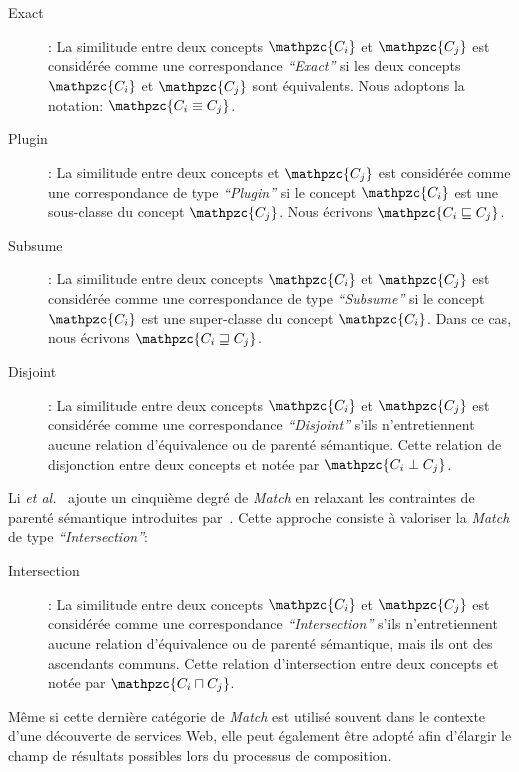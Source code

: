 \begin{description}
\item[Exact]: La similitude entre deux concepts $\mathpzc{C_i}$ et
  $\mathpzc{C_j}$ est considérée comme une correspondance
  \emph{``Exact''} si les deux concepts $\mathpzc{C_i}$ et
  $\mathpzc{C_j}$ sont équivalents. Nous adoptons la notation: {\large
    $\mathpzc{C_i \equiv C_j}$}.\medskip

\item[Plugin]: La similitude entre deux concepts et $\mathpzc{C_j}$
  est considérée comme une correspondance de type \emph{``Plugin''} si
  le concept $\mathpzc{C_i}$ est une sous-classe du concept
  $\mathpzc{C_j}$. Nous écrivons {\large
    $\mathpzc{C_i \sqsubseteq C_j}$}.\medskip

\item[Subsume]: La similitude entre deux concepts $\mathpzc{C_i}$ et
  $\mathpzc{C_j}$ est considérée comme une correspondance de type
  \emph{``Subsume''} si le concept $\mathpzc{C_i}$ est une
  super-classe du concept $\mathpzc{C_i}$. Dans ce cas, nous écrivons
  {\large $\mathpzc{C_i \sqsupseteq C_j}$}.\medskip

\item[Disjoint]: La similitude entre deux concepts $\mathpzc{C_i}$ et
  $\mathpzc{C_j}$ est considérée comme une correspondance
  \emph{``Disjoint''} s'ils n'entretiennent aucune relation
  d'équivalence ou de parenté sémantique. Cette relation de
  disjonction entre deux concepts et notée par {\large
    $\mathpzc{C_i \perp C_j}$}.\medskip
\end{description}


Li \emph{et al.}~\cite{li2004software} ajoute un cinquième degré de
\emph{Match} en relaxant les contraintes de parenté sémantique
introduites par~\cite{paolucci2002semantic}. Cette approche consiste à
valoriser la \emph{Match} de type \emph{``Intersection''}:

\begin{description}
\item[Intersection]: La similitude entre deux concepts $\mathpzc{C_i}$
  et $\mathpzc{C_j}$ est considérée comme une correspondance
  \emph{``Intersection''} s'ils n'entretiennent aucune relation
  d'équivalence ou de parenté sémantique, mais ils ont des ascendants
  communs. Cette relation d'intersection entre deux concepts et notée
  par {\large $\mathpzc{C_i \sqcap C_j}$}.\medskip
\end{description}

Même si cette dernière catégorie de \emph{Match} est utilisé souvent
dans le contexte d'une découverte de services Web, elle peut également
être adopté afin d'élargir le champ de résultats possibles lors du
processus de composition.

